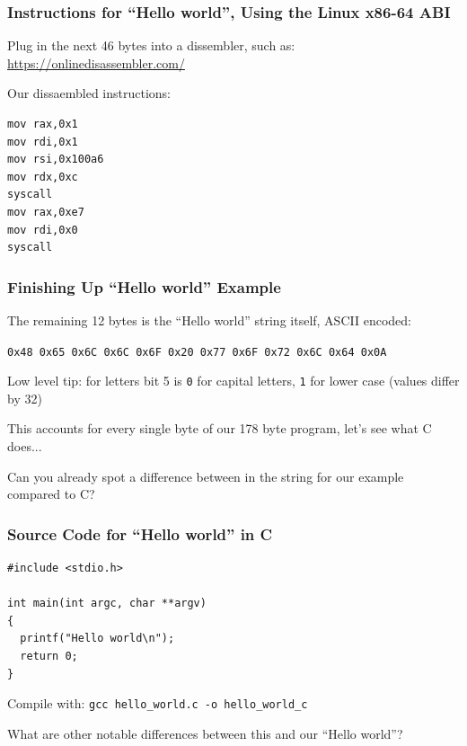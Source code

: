 \documentclass[aspectratio=169]{beamer}
\begin{document}
  \begin{frame}[fragile]
    \frametitle{Instructions for ``Hello world'', Using the Linux x86-64 ABI}

    Plug in the next 46 bytes into a dissembler, such as:
    \url{https://onlinedisassembler.com/}

    \vspace{2em}

    Our dissaembled instructions:
    \begin{lstlisting}[basicstyle=\small\ttfamily]
mov rax,0x1
mov rdi,0x1
mov rsi,0x100a6
mov rdx,0xc
syscall
mov rax,0xe7
mov rdi,0x0
syscall
    \end{lstlisting}
  \end{frame}

  \begin{frame}
    \frametitle{Finishing Up ``Hello world'' Example}

    The remaining 12 bytes is the ``Hello world'' string itself, ASCII encoded:
    
    \texttt{0x48 0x65 0x6C 0x6C 0x6F 0x20 0x77 0x6F 0x72 0x6C 0x64 0x0A}

    \vspace{1em}

    \hspace{1em} Low level tip: for letters bit 5 is \texttt{0} for capital
    letters, \texttt{1} for lower case (values differ by 32)

    \vspace{2em}

    This accounts for every single byte of our 178 byte program, let's see what
    C does...

    \vspace{2em}
    Can you already spot a difference between in the string for our example
    compared to C?
  \end{frame}

  \begin{frame}[fragile]
    \frametitle{Source Code for ``Hello world'' in C}

    \begin{lstlisting}[basicstyle=\ttfamily]
#include <stdio.h>

int main(int argc, char **argv)
{
  printf("Hello world\n");
  return 0;
}
    \end{lstlisting}

    Compile with: \hspace{0.5em} \texttt{gcc hello\_world.c -o hello\_world\_c}

    \vspace{2em}

    What are other notable differences between this and our ``Hello world''?
  \end{frame}
\end{document}
